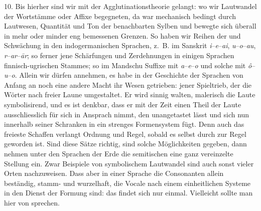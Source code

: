 \label{IV.III.II.4.10}10. Bis hierher sind wir mit der Agglutinationstheorie gelangt: wo wir  Lautwandel der Wortstämme oder Affixe begegneten, da war  mechanisch bedingt durch Lautwesen, Quantität und Ton der benachbarten Sylben und bewegte sich überall in mehr oder minder eng bemessenen Grenzen. So haben wir Reihen der  und Schwächung in den indogermanischen Sprachen, z.~B. im Sanskrit \textit{i}–\textit{e}–\textit{ai}, \textit{u}–\textit{o}–\textit{au}, \textit{r}–\textit{ar}–\textit{ār}; so ferner jene Schärfungen und Zerdehnungen in einigen Sprachen  finnisch-ugrischen Stammes; so im Mandschu Suffixe mit \textit{a}–\textit{e}–\textit{o} und solche mit \textit{ô}–\textit{u}–\textit{o}. Allein \label{sp.353} wir dürfen annehmen, es habe in der Geschichte der Sprachen von Anfang an noch eine andere Macht ihr Wesen getrieben: jener Spieltrieb, der die Wörter nach freier Laune umgestaltet. Er wird sinnig walten, malerisch die Laute symbolisirend, und es ist denkbar, dass er mit der Zeit einen Theil der Laute aus\label{fp.335}schliesslich für sich in Ansprach nimmt, den  unangetastet lässt und sich nun innerhalb seiner Schranken in ein strenges Formensystem fügt. Denn auch das freieste Schaffen verlangt Ordnung und Regel, sobald es selbst durch  zur Regel geworden ist. Sind diese Sätze richtig, sind solche Möglichkeiten gegeben, dann nehmen unter den Sprachen der Erde die semitischen eine ganz vereinzelte Stellung ein. Zwar Beispiele von symbolischem Lautwandel sind auch sonst vieler Orten nachzuweisen. Dass aber in einer Sprache die Consonanten allein beständig, stamm- und wurzelhaft, die Vocale nach einem einheitlichen Systeme in den  Dienst der Formung  sind: das findet sich nur einmal. Vielleicht sollte man hier von  sprechen.

